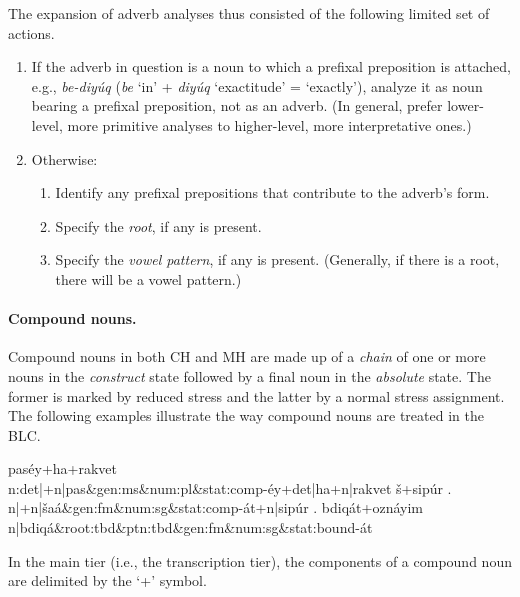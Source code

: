 The expansion of adverb analyses thus consisted of the following limited set of actions. 
\begin{enumerate}
\item If the adverb in question is a noun to which a prefixal preposition is attached, e.g., \textit{be-diy\'uq} (\textit{be} `in' + \textit{diy\'uq} `exactitude' = `exactly'),  %
analyze it as noun bearing a prefixal preposition, not as an adverb. (In general, prefer lower-level, more primitive analyses to higher-level,
more interpretative ones.) 
\item Otherwise: %
    \begin{enumerate}
        \item Identify any prefixal prepositions that contribute to the adverb's form.
        \item Specify the \emph{root}, if any is present.
        \item Specify the \emph{vowel pattern}, if any is present. (Generally, if there is a root, there will be a vowel pattern.) 
    \end{enumerate}
\end{enumerate}

\paragraph{Compound nouns.}
Compound nouns in both \ac{CH} and \ac{MH} are made up of a \emph{chain} of 
one or more nouns in the \emph{construct} state followed by a final noun
in the \emph{absolute} state. The former is marked by reduced stress 
and the latter by a normal stress assignment. The following examples 
illustrate the way compound nouns are treated in the \ac{BLC}.
\begin{exe}
\ex \label{ex:cstr:pasey}
	\textsf{pas\'{e}y+ha+rakvet} \\
	\textsf{n:det|+n|pas\&gen:ms\&num:pl\&stat:comp-\'{e}y+det|ha+n|rakvet}
\ex \label{ex:cstr:shaat} 
	\textsf{\v{s}+sip\'{u}r .} \\
	\textsf{n|+n|\v{s}a\'a\&gen:fm\&num:sg\&stat:comp-\'at+n|sip\'ur .}
\ex \label{ex:cstr:bdiqat} 
	\textsf{bdiq\'{a}t+ozn\'{a}yim} \\ 
	\textsf{n|bdiq\'{a}\&root:tbd\&ptn:tbd\&gen:fm\&num:sg\&stat:bound-\'{a}t}
\end{exe}
In the main tier (i.e., the transcription tier), the components of a compound noun are
delimited by the `+' symbol. 

